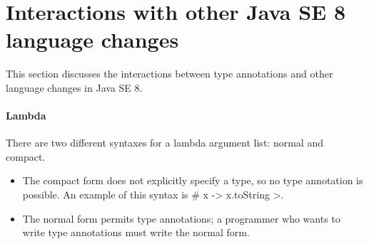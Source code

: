 \documentclass[10pt]{article}
\begin{document}
% 
% 
% 
% 
% 
% 
% 
% 
% 


\section{Interactions with other Java SE 8 language changes\label{java8-interactions}}

This section discusses the interactions between type annotations and other
language changes in Java SE 8.

\paragraph{Lambda}
There are two different syntaxes for a lambda argument list: normal and
compact.
\begin{itemize}
\item
The compact form does not explicitly specify a type, so no type
annotation is possible.  An example of this syntax is \<\#{ x -> x.toString }>.
\item
The normal form permits type annotations; a programmer who wants to write
type annotations must write the normal form.
\end{itemize}
\end{document}
